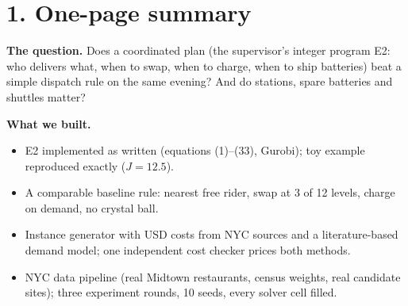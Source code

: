 %
%

\ifdefined\takeaway\else
\newcommand{\takeaway}[1]{\par\noindent\textbf{Takeaway: }#1\par}
\fi
\newcommand{\caveat}[1]{\par\noindent\emph{Caveat: }#1\par}

\section*{1. One-page summary}

\noindent\textbf{The question.} Does a coordinated plan (the supervisor's integer program E2: who delivers what, when to swap, when to charge, when to ship batteries) beat a simple dispatch rule on the same evening? And do stations, spare batteries and shuttles matter?

\noindent\textbf{What we built.}
\begin{itemize}\small\setlength{\itemsep}{0pt}
  \item E2 implemented as written (equations (1)--(33), Gurobi); toy example reproduced exactly ($J = 12.5$).
  \item A comparable baseline rule: nearest free rider, swap at 3 of 12 levels, charge on demand, no crystal ball.
  \item Instance generator with USD costs from NYC sources and a literature-based demand model; one independent cost checker prices both methods.
  \item NYC data pipeline (real Midtown restaurants, census weights, real candidate sites); three experiment rounds, 10 seeds, every solver cell filled.
\end{itemize}

